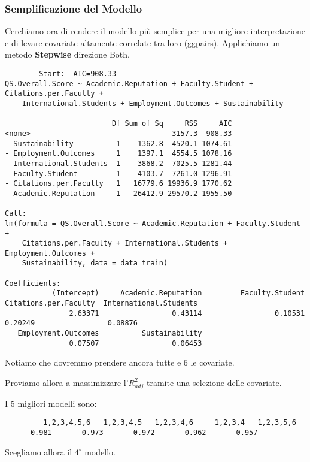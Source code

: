 \documentclass{beamer}
\begin{document}
\begin{frame}[fragile]
	\frametitle{Semplificazione del Modello}
	Cerchiamo ora di rendere il modello più semplice per una migliore interpretazione e di levare covariate altamente correlate tra loro (ggpairs).
    Applichiamo un metodo \textbf{Stepwise} direzione Both.
   {\TINY
	\begin{verbatim}
		Start:  AIC=908.33
QS.Overall.Score ~ Academic.Reputation + Faculty.Student + Citations.per.Faculty + 
    International.Students + Employment.Outcomes + Sustainability

                         Df Sum of Sq     RSS     AIC
<none>                                 3157.3  908.33
- Sustainability          1    1362.8  4520.1 1074.61
- Employment.Outcomes     1    1397.1  4554.5 1078.16
- International.Students  1    3868.2  7025.5 1281.44
- Faculty.Student         1    4103.7  7261.0 1296.91
- Citations.per.Faculty   1   16779.6 19936.9 1770.62
- Academic.Reputation     1   26412.9 29570.2 1955.50

Call:
lm(formula = QS.Overall.Score ~ Academic.Reputation + Faculty.Student + 
    Citations.per.Faculty + International.Students + Employment.Outcomes + 
    Sustainability, data = data_train)

Coefficients:
           (Intercept)     Academic.Reputation         Faculty.Student   Citations.per.Faculty  International.Students  
               2.63371                 0.43114                 0.10531                 0.20249                 0.08876  
   Employment.Outcomes          Sustainability  
               0.07507                 0.06453

	\end{verbatim}
	}
	Notiamo che dovremmo prendere ancora tutte e 6 le covariate.
\end{frame}

\begin{frame}[fragile]
	Proviamo allora a massimizzare l'$R^2_{adj}$ tramite una selezione delle covariate.
 
        \vspace*{1cm}
    I 5 migliori modelli sono:
 
	{\small
    \begin{verbatim}
		 1,2,3,4,5,6   1,2,3,4,5   1,2,3,4,6     1,2,3,4   1,2,3,5,6 
      0.981       0.973       0.972       0.962       0.957
	\end{verbatim}
    }
	\vspace*{1cm}
	Scegliamo allora il $4^\circ$ modello.
\end{frame}
\end{document}

